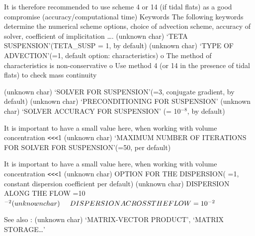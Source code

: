 It is therefore recommended to use scheme 4 or 14 (if tidal flats) as a good
compromise (accuracy/computational time)\newline
Keywords\newline
The following keywords determine the numerical scheme options, choice of
advection scheme, accuracy of solver, coefficient of implicitation \dots . 
\newline
(unknown char)\hspace{5mm} `TETA SUSPENSION'(TETA\_SUSP = 1, by default) 
\newline
(unknown char)\hspace{5mm} `TYPE OF ADVECTION'(=1, default option:
characteristics)\newline
o\hspace{5mm} The method of characteristics is non-conservative\newline
o\hspace{5mm} Use method 4 (or 14 in the presence of tidal flats) to check
mass continuity

(unknown char)\hspace{5mm} `SOLVER FOR SUSPENSION'(=3, conjugate gradient,
by default)\newline
(unknown char)\hspace{5mm} `PRECONDITIONING FOR SUSPENSION'\newline
(unknown char)\hspace{5mm} `SOLVER ACCURACY FOR SUSPENSION' (= 10$^{-8}$, by
default)

It is important to have a small value here, when working with volume
concentration \texttt{<}\texttt{<}\texttt{<}1\newline
(unknown char)\hspace{5mm} `MAXIMUM NUMBER OF ITERATIONS FOR SOLVER FOR
SUSPENSION'(=50, per default)

It is important to have a small value here, when working with volume
concentration \texttt{<}\texttt{<}\texttt{<}1\newline
(unknown char)\hspace{5mm} OPTION FOR THE DISPERSION( =1, constant
dispersion coefficient per default)\newline
(unknown char)\hspace{5mm} DISPERSION ALONG THE FLOW =10$^{-2}(unknown char)%
\hspace{5mm} DISPERSION ACROSS THE FLOW =10^{-2}$

See also : \newline
(unknown char)\hspace{5mm} `MATRIX-VECTOR PRODUCT', `MATRIX STORAGE\dots '

